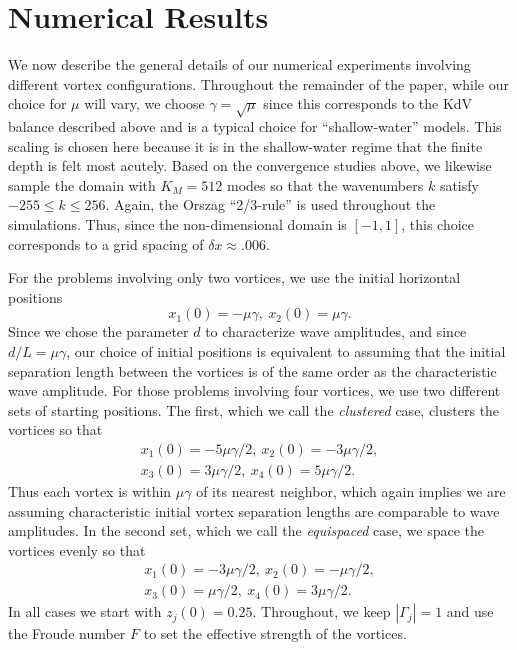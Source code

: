 \documentclass[a4paper,11pt]{article}
\begin{document}
\section{Numerical Results}

We now describe the general details of our numerical experiments involving different vortex configurations.  Throughout the remainder of the paper, while our choice for $\mu$ will vary, we choose $\gamma = \sqrt{\mu}$ since this corresponds to the KdV balance described above and is a typical choice for ``shallow-water'' models.  This scaling is chosen here because it is in the shallow-water regime that the finite depth is felt most acutely.  Based on the convergence studies above, we likewise sample the domain with $K_{M} = 512$ modes so that the wavenumbers $k$ satisfy $-255\leq k \leq 256$.  Again, the Orszag ``2/3-rule'' is used throughout the simulations.  Thus, since the non-dimensional domain is $[-1,1]$, this choice corresponds to a grid spacing of $\delta x \approx .006$.  

For the problems involving only two vortices, we use the initial horizontal positions
\begin{equation}
x_{1}(0)=-\mu\gamma, \ x_{2}(0)=\mu\gamma.
\label{initxpostv}
\end{equation}
Since we chose the parameter $d$ to characterize wave amplitudes, and since $d/L=\mu\gamma$, our choice of initial positions is equivalent to assuming that the initial  separation length between the vortices is of the same order as the characteristic wave amplitude.  For those problems involving four vortices, we use two different sets of starting positions.  The first, which we call the {\it clustered} case, clusters the vortices so that  
\begin{align*}
x_{1}(0)=-5\mu\gamma/2, ~ x_{2}(0)=-3\mu\gamma/2,\\ 
x_{3}(0)=3\mu\gamma/2,  ~ x_{4}(0)=5\mu\gamma/2.
\end{align*}
Thus each vortex is within $\mu\gamma$ of its nearest neighbor, which again implies we are assuming characteristic initial vortex separation lengths are comparable to wave amplitudes.  In the second set, which we call the {\it equispaced} case, we space the vortices evenly so that 
\begin{align*}
x_{1}(0)=-3\mu\gamma/2,  ~ x_{2}(0)=-\mu\gamma/2,\\ 
x_{3}(0)=\mu\gamma/2,   ~ x_{4}(0)=3\mu\gamma/2.
\end{align*}
In all cases we start with $z_{j}(0)=0.25$.  Throughout, we keep $|\Gamma_{j}|=1$ and use the Froude number $F$ to set the effective strength of the vortices.  
\end{document}
